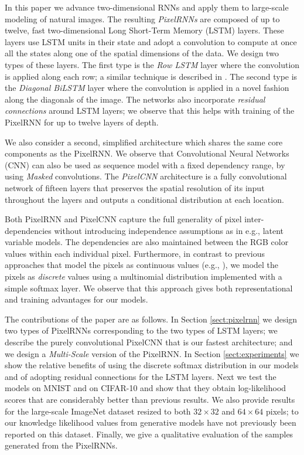 In this paper we advance two-dimensional RNNs and apply them to large-scale modeling of natural images.
The resulting \emph{PixelRNNs} are composed of up to twelve, fast two-dimensional Long Short-Term Memory (LSTM) layers. These layers use LSTM units in their state \cite{hochreiter1997long, graves2009offline}  and adopt a convolution to compute at once all the states along one of the spatial dimensions of the data. We design two types of these layers. The first type is the \emph{Row LSTM} layer where the convolution is applied along each row; a similar technique is described in \cite{NIPS2015_5642}. The second type is the \emph{Diagonal BiLSTM} layer where the convolution is applied in a novel fashion along the diagonals of the image. The networks also incorporate \emph{residual connections} \cite{DBLP:journals/corr/HeZRS15} around LSTM layers; we observe that this helps with training of the PixelRNN for up to twelve layers of depth. 

We also consider a second, simplified architecture which shares the same core components as the PixelRNN. 
We observe that Convolutional Neural Networks (CNN) can also be used as sequence model with a fixed dependency range, by using \emph{Masked} convolutions. The \emph{PixelCNN} architecture is a fully convolutional network of fifteen layers that preserves the spatial resolution of its input throughout the layers and outputs a conditional distribution at each location.
 
Both PixelRNN and PixelCNN capture the full generality of pixel inter-dependencies without introducing independence assumptions as in e.g., latent variable models. The dependencies are also maintained between the RGB color values within each individual pixel. 
Furthermore, in contrast to previous approaches that model the pixels as continuous values (e.g., \citet{theis2015generative, gregor2013deep}), we model the pixels as \emph{discrete} values using a multinomial distribution implemented with a simple softmax layer. We observe that this approach gives both representational and training advantages for our models.


The contributions of the paper are as follows. In Section \ref{sect:pixelrnn} we design two types of PixelRNNs corresponding to the two types of LSTM layers; we describe the purely convolutional PixelCNN that is our fastest architecture; and we design a \emph{Multi-Scale} version of the PixelRNN.
In Section \ref{sect:experiments} we show the relative benefits of using the discrete softmax distribution in our models and of adopting residual connections for the LSTM layers. Next we test the models on MNIST and on CIFAR-10 and show that they obtain log-likelihood scores that are considerably better than previous results. We also provide results for the large-scale ImageNet dataset resized to both $32 \times 32$ and $64 \times 64$ pixels; to our knowledge likelihood values from generative models have not previously been reported on this dataset. Finally, we give a qualitative evaluation of the samples generated from the PixelRNNs. %


